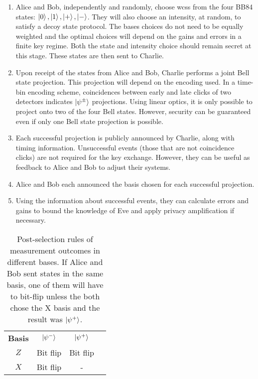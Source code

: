 \begin{enumerate}
	\item {} Alice and Bob, independently and randomly, choose \acp{wcs} from the four BB84 states: $\ket{0}, \ket{1}, \ket{+}, \ket{-}$. They will also choose an intensity, at random, to satisfy a decoy state protocol. The bases choices do not need to be equally weighted and the optimal choices will depend on the gains and errors in a finite key regime. Both the state and intensity choice should remain secret at this stage. These states are then sent to Charlie. 
	\item {} Upon receipt of the states from Alice and Bob, Charlie performs a joint Bell state projection. This projection will depend on the encoding used. In a time-bin encoding scheme, coincidences between early and late clicks of two detectors indicates $\ket{\psi^\pm}$ projections. Using linear optics, it is only possible to project onto two of the four Bell states. However, security can be guaranteed even if only one Bell state projection is possible.
	\item {} Each successful projection is publicly announced by Charlie, along with timing information. Unsuccessful events (those that are not coincidence clicks) are not required for the key exchange. However, they can be useful as feedback to Alice and Bob to adjust their systems.
	\item {} Alice and Bob each announced the basis chosen for each successful projection.
	\item {} Using the information about successful events, they can calculate errors and gains to bound the knowledge of Eve and apply privacy amplification if necessary.
\end{enumerate}

\begin{table}[tbp]
\centering
\begin{tabular}{@{}cccc@{}}
\textbf{Basis}      & $\ket{\psi^-}$     & $\ket{\psi^+}$        \\
$Z$              & Bit flip           & Bit flip                \\
$X$              & Bit flip           & \multicolumn{1}{c}{-}   \\
\end{tabular}
\caption[Measurement outcomes in MDI-QKD]{Post-selection rules of measurement outcomes in different bases. If Alice and Bob sent states in the same basis, one of them will have to bit-flip unless the both chose the X basis and the result was $\ket{\psi^+}$.}
\label{tab:mdi-outcomes}
\end{table}

